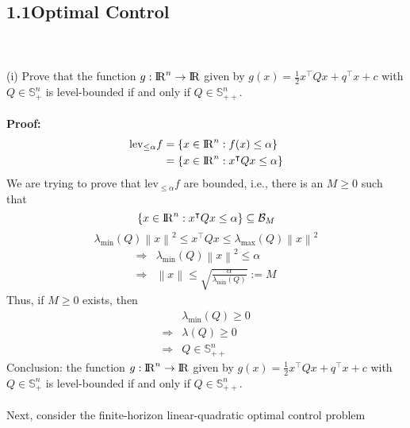 \documentclass[a4paper,11pt,reqno]{amsart}
\newcommand{\R}{{\rm I\!R}}
\newcommand{\tran}{\intercal}
\begin{document}
\subsection*{1.1\quad Optimal Control}\label{sec:q1}
\
\\ \\
(i) Prove that the function $g:\R^n\to \R$ given by $g(x) = \frac{1}{2}x^{\tran}Qx+q^{\tran}x+c$ with $Q\in \mathbb{S}^n_+$ is level-bounded
if and only if $Q\in \mathbb{S}^n_{++}$.
\\ \\
\textbf{Proof:}
\begin{align}
    \mathrm{lev}_{\leq \alpha}f&=\{x\in\R^n:f(x)\leq\alpha\}\notag\\
    &=\{x\in\R^n:x^{\tran}Qx\leq\alpha\}
\end{align}
We are trying to prove that $\mathrm{lev}_{\leq \alpha}f$ are bounded, i.e., there is an $M\geq 0$ such that
\begin{equation}
    \{x\in\R^n:x^{\tran}Qx\leq\alpha\}\subseteq \mathcal{B}_M
\end{equation}
\begin{equation}
    \lambda_{\mathrm{min}}(Q)\left\lVert x\right\rVert ^2\leq x^{\tran}Qx\leq \lambda_{\mathrm{max}}(Q)\left\lVert x\right\rVert ^2
\end{equation}
\begin{align}
    \Longrightarrow &\lambda_{\mathrm{min}}(Q)\left\lVert x\right\rVert ^2\leq \alpha\\
    \Longrightarrow &\left\lVert x\right\rVert \leq \sqrt{\frac{\alpha}{\lambda_{\mathrm{min}}(Q)}}:=M
\end{align}
Thus, if $M\geq 0$ exists, then
\begin{align}
    &\lambda_{\mathrm{min}}(Q)\geq 0\\
    \Longrightarrow&\lambda(Q)\geq 0\\
    \Longrightarrow &Q\in \mathbb{S}^n_{++}
\end{align}
Conclusion: the function $g:\R^n\to \R$ given by $g(x) = \frac{1}{2}x^{\tran}Qx+q^{\tran}x+c$ with $Q\in \mathbb{S}^n_+$ is level-bounded
if and only if $Q\in \mathbb{S}^n_{++}$.
\\ \\
Next, consider the finite-horizon linear-quadratic optimal control problem
\end{document}
